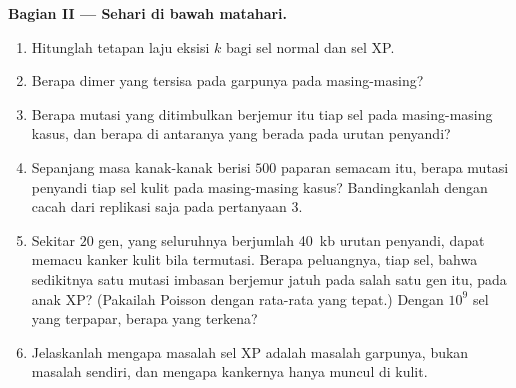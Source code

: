 \begin{problem}
\medskip
\noindent\textbf{Bagian II --- Sehari di bawah matahari.}
\begin{enumerate}[resume]
  \item Hitunglah tetapan laju eksisi $k$ bagi sel normal dan sel
        XP.
  \item Berapa dimer yang tersisa pada garpunya pada masing-masing?
  \item Berapa mutasi yang ditimbulkan berjemur itu tiap sel pada
        masing-masing kasus, dan berapa di antaranya yang berada pada
        urutan penyandi?
  \item Sepanjang masa kanak-kanak berisi $500$ paparan semacam itu,
        berapa mutasi penyandi tiap sel kulit pada masing-masing kasus?
        Bandingkanlah dengan cacah dari replikasi saja pada pertanyaan 3.
  \item Sekitar $20$ gen, yang seluruhnya berjumlah \qty{40}{kb} urutan
        penyandi, dapat memacu kanker kulit bila termutasi. Berapa
        peluangnya, tiap sel, bahwa sedikitnya satu mutasi imbasan
        berjemur jatuh pada salah satu gen itu, pada anak XP? (Pakailah
        Poisson dengan rata-rata yang tepat.) Dengan $10^{9}$ sel yang
        terpapar, berapa yang terkena?
  \item Jelaskanlah mengapa masalah sel XP adalah masalah garpunya, bukan
        masalah  sendiri, dan mengapa kankernya hanya muncul di kulit.
\end{enumerate}


\end{problem}
